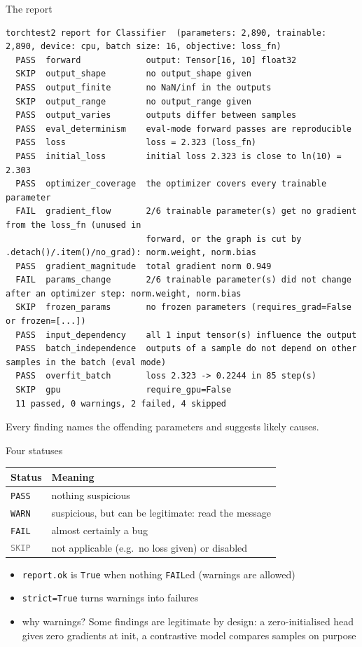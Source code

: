 \documentclass[aspectratio=169,11pt]{beamer}
\newcommand{\PASS}{\textcolor{pass}{\texttt{PASS}}}
\newcommand{\WARN}{\textcolor{warn}{\texttt{WARN}}}
\newcommand{\FAIL}{\textcolor{fail}{\texttt{FAIL}}}
\newcommand{\SKIP}{\textcolor{gray}{\texttt{SKIP}}}
\begin{document}
\begin{frame}[fragile]{The report}
  \begin{lstlisting}[style=report]
torchtest2 report for Classifier  (parameters: 2,890, trainable: 2,890, device: cpu, batch size: 16, objective: loss_fn)
  PASS  forward             output: Tensor[16, 10] float32
  SKIP  output_shape        no output_shape given
  PASS  output_finite       no NaN/inf in the outputs
  SKIP  output_range        no output_range given
  PASS  output_varies       outputs differ between samples
  PASS  eval_determinism    eval-mode forward passes are reproducible
  PASS  loss                loss = 2.323 (loss_fn)
  PASS  initial_loss        initial loss 2.323 is close to ln(10) = 2.303
  PASS  optimizer_coverage  the optimizer covers every trainable parameter
  FAIL  gradient_flow       2/6 trainable parameter(s) get no gradient from the loss_fn (unused in
                            forward, or the graph is cut by .detach()/.item()/no_grad): norm.weight, norm.bias
  PASS  gradient_magnitude  total gradient norm 0.949
  FAIL  params_change       2/6 trainable parameter(s) did not change after an optimizer step: norm.weight, norm.bias
  SKIP  frozen_params       no frozen parameters (requires_grad=False or frozen=[...])
  PASS  input_dependency    all 1 input tensor(s) influence the output
  PASS  batch_independence  outputs of a sample do not depend on other samples in the batch (eval mode)
  PASS  overfit_batch       loss 2.323 -> 0.2244 in 85 step(s)
  SKIP  gpu                 require_gpu=False
  11 passed, 0 warnings, 2 failed, 4 skipped
  \end{lstlisting}
  \small Every finding \alert{names the offending parameters} and suggests likely causes.
\end{frame}

\begin{frame}{Four statuses}
  \centering
  \begin{tabular}{ll}
    \toprule
    Status & Meaning \\
    \midrule
    \PASS & nothing suspicious \\
    \WARN & suspicious, but can be legitimate: \alert{read the message} \\
    \FAIL & almost certainly a bug \\
    \SKIP & not applicable (e.g.\ no loss given) or disabled \\
    \bottomrule
  \end{tabular}
  \bigskip
  \begin{itemize}
    \item \texttt{report.ok} is \texttt{True} when nothing \FAIL{}ed (warnings are allowed)
    \item \texttt{strict=True} turns warnings into failures
    \item why warnings? Some findings are legitimate by design: a zero-initialised head gives
          zero gradients at init, a contrastive model compares samples on purpose
  \end{itemize}
\end{frame}
\end{document}
